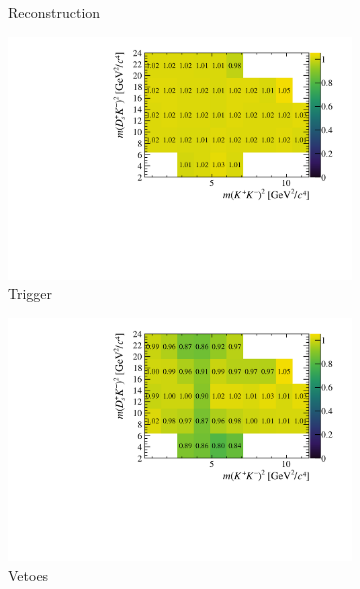 \begin{figure}[!h]
\begin{subfigure}[t]{0.40\textwidth}
        \caption{Reconstruction}
        \label{fig:B2DsKK_releff_reconstruction}
    \end{subfigure}
    \begin{subfigure}[t]{0.40\textwidth}
        \includegraphics[width=1.0\textwidth]{figs/B2DsKK/Relative_Eff_trig_All.pdf}
        \caption{Trigger}
        \label{fig:B2DsKK_releff_trigger}
    \end{subfigure}
    \begin{subfigure}[t]{0.40\textwidth}
        \includegraphics[width=1.0\textwidth]{figs/B2DsKK/Relative_Eff_veto_All.pdf}
        \caption{Vetoes}
        \label{fig:B2DsKK_releff_vetoes}
    \end{subfigure}
    \begin{subfigure}[t]{0.40\textwidth}

\end{subfigure}
\end{figure}
